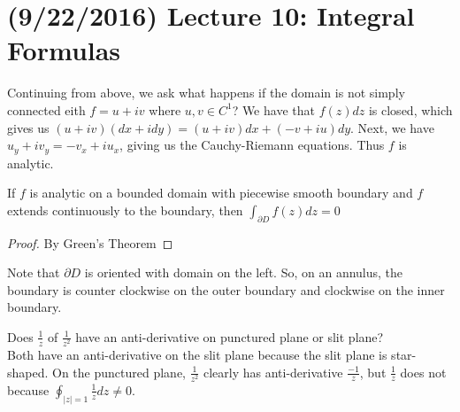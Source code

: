 \documentclass[11pt,leqno,oneside]{amsart}
\begin{document}
  \section{(9/22/2016) Lecture 10: Integral Formulas}
  Continuing from above, we ask what happens if the domain is not
  simply connected eith $f = u+iv$ where $u,v \in C^1$? We have that
  $f(z)dz$ is closed, which gives us $(u+iv)(dx+idy) =
  (u+iv)dx+(-v+iu)dy$. Next, we have $u_y+iv_y = -v_x+iu_x$, giving us
  the Cauchy-Riemann equations. Thus $f$ is analytic.
  \begin{thm}
    If $f$ is analytic on a bounded domain with piecewise smooth
    boundary and $f$ extends continuously to the boundary, then
    $\int_{\partial D} f(z)dz = 0$
  \end{thm}
  \begin{proof}
    By Green's Theorem
  \end{proof}
  Note that $\partial D$ is oriented with domain on the left. So, on
  an annulus, the boundary is counter clockwise on the outer boundary
  and clockwise on the inner boundary.
  \begin{example}
    Does $\frac{1}{z}$ of $\frac{1}{z^2}$ have an anti-derivative on
    punctured plane or slit plane? \\

    Both have an anti-derivative on the slit plane because the slit
    plane is star-shaped. On the punctured plane, $\frac{1}{z^2}$
    clearly has anti-derivative $\frac{-1}{z}$, but $\frac{1}{z}$ does
    not because $\oint_{|z|=1} \frac{1}{z}dz \neq 0$.
  \end{example}
\end{document}
